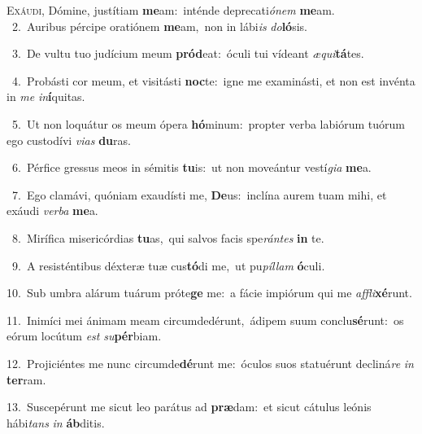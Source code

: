 \lettrine{\initial\textcolor{\initialcolor}{E}}{xáudi,} Dómine, justítiam \textbf{me}\-am:~\star inténde deprecati\-\textit{ó}\-\textit{nem} \textbf{me}\-am.\\
{\numbfont\textcolor{\numbcolor}{~2.}}~Auribus pércipe oratiónem \textbf{me}\-am,~\star non in lábi\textit{is} \textit{do}\-\textbf{ló}sis.\par
{\numbfont\textcolor{\numbcolor}{~3.}}~De vultu tuo judícium meum \textbf{pród}\-eat:~\star óculi tui vídeant \textit{æ}\-\textit{qui}\textbf{tá}tes.\par
{\numbfont\textcolor{\numbcolor}{~4.}}~Probásti cor meum, et visitásti \textbf{noc}\-te:~\star igne me examinásti, et non est invénta in \textit{me} \textit{in}\-\textbf{í}quitas.\par
{\numbfont\textcolor{\numbcolor}{~5.}}~Ut non loquátur os meum ópera \textbf{hó}\-minum:~\star propter verba labiórum tuórum ego custodívi \textit{vi}\-\textit{as} \textbf{du}\-ras.\par
{\numbfont\textcolor{\numbcolor}{~6.}}~Pérfice gressus meos in sémitis \textbf{tu}\-is:~\star ut non moveántur vestí\-\textit{gi}\-\textit{a} \textbf{me}\-a.\par
{\numbfont\textcolor{\numbcolor}{~7.}}~Ego clamávi, quóniam exaudísti me, \textbf{De}\-us:~\star inclína aurem tuam mihi, et exáudi \textit{ver}\-\textit{ba} \textbf{me}\-a.\par
{\numbfont\textcolor{\numbcolor}{~8.}}~Mirífica misericórdias \textbf{tu}\-as,~\star qui salvos facis spe\-\textit{rán}\-\textit{tes} \textbf{in} te.\par
{\numbfont\textcolor{\numbcolor}{~9.}}~A resisténtibus déxteræ tuæ cus\-\textbf{tó}\-di me,~\star ut pu\-\textit{píl}\-\textit{lam} \textbf{ó}\-culi.\par
{\numbfont\textcolor{\numbcolor}{10.}}~Sub umbra alárum tuárum próte\textbf{ge} me:~\star a fácie impiórum qui me \textit{af}\-\textit{fli}\textbf{xé}runt.\par
{\numbfont\textcolor{\numbcolor}{11.}}~Inimíci mei ánimam meam circumdedérunt,~\dagger ádipem suum conclu\-\textbf{sé}\-runt:~\star os eórum locútum \textit{est} \textit{su}\-\textbf{pér}biam.\par
{\numbfont\textcolor{\numbcolor}{12.}}~Projiciéntes me nunc circumde\-\textbf{dé}\-runt me:~\star óculos suos statuérunt decliná\textit{re} \textit{in} \textbf{ter}\-ram.\par
{\numbfont\textcolor{\numbcolor}{13.}}~Suscepérunt me sicut leo parátus ad \textbf{præ}\-dam:~\star et sicut cátulus leónis hábi\textit{tans} \textit{in} \textbf{áb}\-ditis.\par
